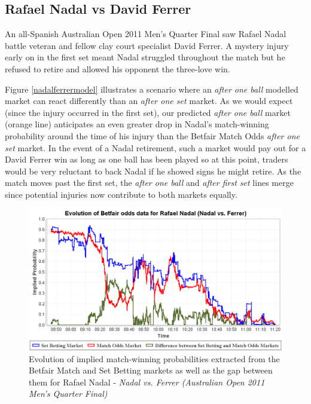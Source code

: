 \documentclass[authoryear, 12pt]{elsarticle}
\begin{document}
\subsection{Rafael Nadal vs David Ferrer}

An all-Spanish Australian Open 2011 Men's Quarter Final saw Rafael Nadal battle veteran and fellow clay court specialist David Ferrer.  A mystery injury early on in the first set meant Nadal struggled throughout the match but he refused to retire and allowed his opponent the three-love win.

Figure \ref{nadalferrermodel} illustrates a scenario where an \textit{after one ball} modelled market can react differently than an \textit{after one set} market.  As we would expect (since the injury occurred in the first set), our predicted \textit{after one ball} market (orange line) anticipates an even greater drop in Nadal's match-winning probability around the time of his injury than the Betfair Match Odds \textit{after one set} market.  In the event of a Nadal retirement, such a market would pay out for a David Ferrer win as long as one ball has been played so at this point, traders would be very reluctant to back Nadal if he showed signs he might retire.  As the match moves past the first set, the \textit{after one ball} and \textit{after first set} lines merge since potential injuries now contribute to both markets equally.

\begin{figure}[H]
  \centering \includegraphics[width=12.3cm]{nadalferrer}
  \caption{Evolution of implied match-winning probabilities extracted from the Betfair Match and Set Betting markets as well as the gap between them for Rafael Nadal - \textit{Nadal vs. Ferrer (Australian Open 2011 Men's Quarter Final)}}
  \label{nadalferrer}
\end{figure}
\end{document}
